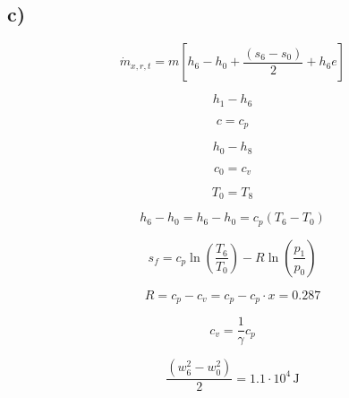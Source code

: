 

\subsection*{c)}

\[
\dot{m}_{x, r, t} = m \left[ h_6 - h_0 + \frac{(s_6 - s_0)}{2} + h_6 e \right]
\]

\[
h_1 - h_6
\]

\[
c = c_p
\]

\[
h_0 - h_8
\]

\[
c_0 = c_v
\]

\[
T_0 = T_8
\]

\[
h_6 - h_0 = h_6 - h_0 = c_p (T_6 - T_0)
\]

\[
s_f = c_p \ln \left( \frac{T_6}{T_0} \right) - R \ln \left( \frac{p_1}{p_0} \right)
\]

\[
R = c_p - c_v = c_p - c_p \cdot x = 0.287
\]

\[
c_v = \frac{1}{\gamma} c_p
\]

\[
\frac{(w_6^2 - w_0^2)}{2} = 1.1 \cdot 10^4 \, \text{J}
\]